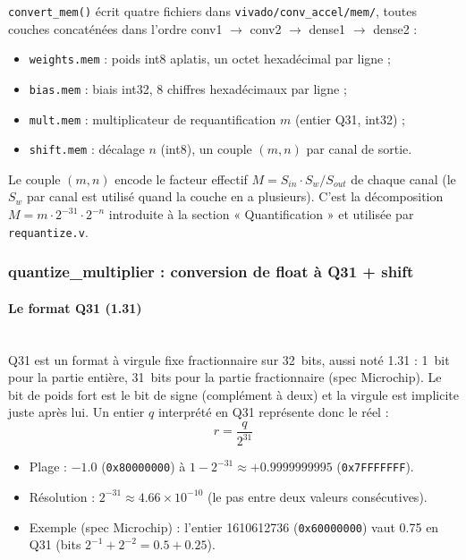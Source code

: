 \documentclass[11pt,a4paper]{article}
\begin{document}
\texttt{convert\_mem()} écrit quatre fichiers dans
\texttt{vivado/conv\_accel/mem/}, toutes couches concaténées dans l'ordre
conv1 $\to$ conv2 $\to$ dense1 $\to$ dense2 :
\begin{itemize}
  \item \texttt{weights.mem} : poids int8 aplatis, un octet hexadécimal par
    ligne ;
  \item \texttt{bias.mem} : biais int32, 8 chiffres hexadécimaux par ligne ;
  \item \texttt{mult.mem} : multiplicateur de requantification $m$ (entier
    Q31, int32) ;
  \item \texttt{shift.mem} : décalage $n$ (int8), un couple $(m, n)$ par
    canal de sortie.
\end{itemize}

Le couple $(m, n)$ encode le facteur effectif
$M = S_{in} \cdot S_w / S_{out}$ de chaque canal (le $S_w$ par canal est
utilisé quand la couche en a plusieurs). C'est la décomposition
$M = m \cdot 2^{-31} \cdot 2^{-n}$ introduite à la section « Quantification »
et utilisée par \texttt{requantize.v}.

\subsubsection{quantize\_multiplier : conversion de float à Q31 + shift}

\paragraph{Le format Q31 (1.31)}\mbox{}\\

Q31 est un format à virgule fixe fractionnaire sur 32~bits, aussi noté 1.31 :
1~bit pour la partie entière, 31~bits pour la partie fractionnaire (spec
Microchip). Le bit de poids fort est le bit de signe (complément à deux) et
la virgule est implicite juste après lui. Un entier $q$ interprété en Q31
représente donc le réel :
\begin{equation*}
  r = \frac{q}{2^{31}}
\end{equation*}
\begin{itemize}
  \item Plage : $-1.0$ (\texttt{0x80000000}) à
    $1 - 2^{-31} \approx +0.9999999995$ (\texttt{0x7FFFFFFF}).
  \item Résolution : $2^{-31} \approx 4.66 \times 10^{-10}$ (le pas entre
    deux valeurs consécutives).
  \item Exemple (spec Microchip) : l'entier 1610612736
    (\texttt{0x60000000}) vaut 0.75 en Q31 (bits $2^{-1} + 2^{-2} = 0.5 +
    0.25$).
\end{itemize}
\end{document}
